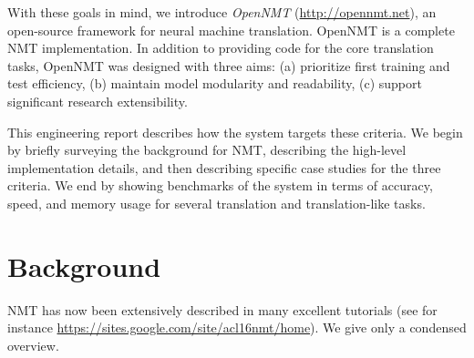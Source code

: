 \documentclass[11pt,a4paper]{article}
\begin{document}
With these goals in mind, we introduce \textit{OpenNMT}
(\url{http://opennmt.net}), an open-source framework for neural
machine translation. OpenNMT is a complete NMT implementation. In
addition to providing code for the core translation tasks, OpenNMT was
designed with three aims: (a) prioritize first training and test
efficiency, (b) maintain model modularity and readability, (c) support
significant research extensibility.

This engineering report describes how the system targets these
criteria. We begin by briefly surveying the background for NMT,
describing the high-level implementation details, and then describing
specific case studies for the three criteria.  We end by showing
benchmarks of the system in terms of accuracy, speed, and memory usage
for several translation and translation-like tasks.








\section{Background}

NMT has now been extensively described in many
excellent tutorials (see for instance
\url{https://sites.google.com/site/acl16nmt/home}). We give only
a condensed overview. 
\end{document}
